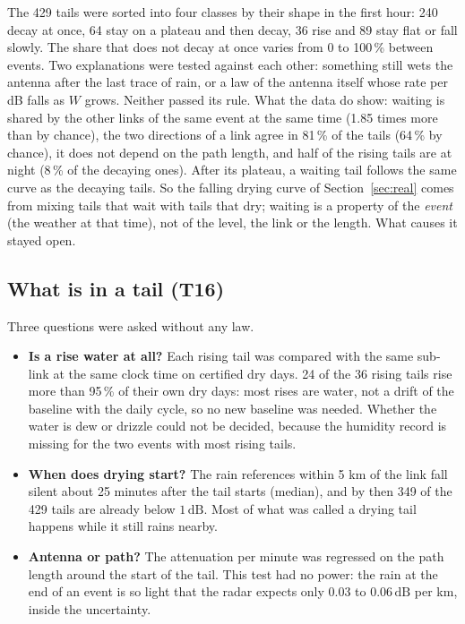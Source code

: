 \documentclass[11pt,a4paper]{article}
\newcommand{\dB}{\,\mathrm{dB}}
\begin{document}
The 429 tails were sorted into four classes by their shape in the first hour: 240 decay at once, 64 stay on a
plateau and then decay, 36 rise and 89 stay flat or fall slowly. The share that does not decay at once varies from
0 to 100\,\% between events. Two explanations were tested against each other: something still wets the antenna after
the last trace of rain, or a law of the antenna itself whose rate per dB falls as $W$ grows. Neither passed its rule.
What the data do show: waiting is shared by the other links of the same event at the same time (1.85 times more than
by chance), the two directions of a link agree in 81\,\% of the tails (64\,\% by chance), it does not depend on the
path length, and half of the rising tails are at night (8\,\% of the decaying ones). After its plateau, a waiting
tail follows the same curve as the decaying tails. So the falling drying curve of Section~\ref{sec:real} comes from
mixing tails that wait with tails that dry; waiting is a property of the \emph{event} (the weather at that time), not
of the level, the link or the length. What causes it stayed open.

\subsection{What is in a tail (T16)}

Three questions were asked without any law.
\begin{itemize}
\item \textbf{Is a rise water at all?} Each rising tail was compared with the same sub-link at the same clock time on
certified dry days. 24 of the 36 rising tails rise more than 95\,\% of their own dry days: most rises are water, not a
drift of the baseline with the daily cycle, so no new baseline was needed. Whether the water is dew or drizzle could
not be decided, because the humidity record is missing for the two events with most rising tails.
\item \textbf{When does drying start?} The rain references within 5 km of the link fall silent about 25 minutes after
the tail starts (median), and by then 349 of the 429 tails are already below $1\dB$. Most of what was called a drying
tail happens while it still rains nearby.
\item \textbf{Antenna or path?} The attenuation per minute was regressed on the path length around the start of the
tail. This test had no power: the rain at the end of an event is so light that the radar expects only 0.03 to
$0.06\dB$ per km, inside the uncertainty.
\end{itemize}
\end{document}
